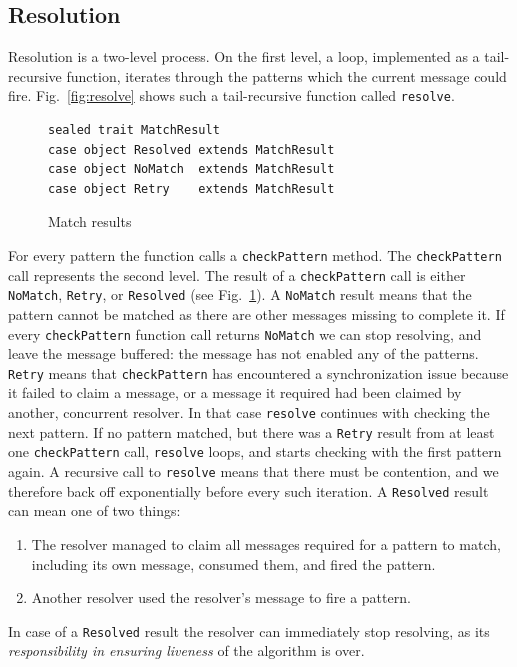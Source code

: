 \documentclass[runningheads]{llncs}
\begin{document}
\begin{sloppypar}
\subsection{Resolution}

Resolution is a two-level process. On the first level, a loop, implemented as
a tail-recursive function, iterates through the patterns which the current
message could fire. Fig.~\ref{fig:resolve} shows such a tail-recursive
function called \verb|resolve|.

\begin{figure}[ht]
\centering
\begin{lstlisting}
sealed trait MatchResult
case object Resolved extends MatchResult
case object NoMatch  extends MatchResult
case object Retry    extends MatchResult
\end{lstlisting}
\caption{Match results}
\label{fig:match-results}
\end{figure}

For every pattern the function calls a \verb|checkPattern| method. The
\verb|checkPattern| call represents the second level. The result of a
\verb|checkPattern| call is either \verb|NoMatch|, \verb|Retry|, or
\verb|Resolved| (see Fig.~\ref{fig:match-results}). A \texttt{NoMatch}
result means that the pattern cannot be matched as there are other messages
missing to complete it. If every \texttt{checkPattern} function call returns
\texttt{NoMatch} we can stop resolving, and leave the message buffered: the
message has not enabled any of the patterns. \texttt{Retry} means that
\texttt{checkPattern} has encountered a synchronization issue because it
failed to claim a message, or a message it required had been claimed by
another, concurrent resolver. In that case \verb|resolve| continues with
checking the next pattern. If no pattern matched, but there was a
\texttt{Retry} result from at least one \texttt{checkPattern} call,
\verb|resolve| loops, and starts checking with the first pattern again. A
recursive call to \verb|resolve| means that there must be contention, and we
therefore back off exponentially before every such iteration. A
\texttt{Resolved} result can mean one of two things:

\begin{enumerate}
\item The resolver managed to claim all messages required for a pattern
      to match, including its own message, consumed them, and fired the
      pattern.
\item Another resolver used the resolver's message to fire a pattern.
\end{enumerate}
\noindent
In case of a \texttt{Resolved} result the resolver can immediately stop
resolving, as its {\em responsibility in ensuring liveness} of the algorithm
is over.


\end{sloppypar}
\end{document}
